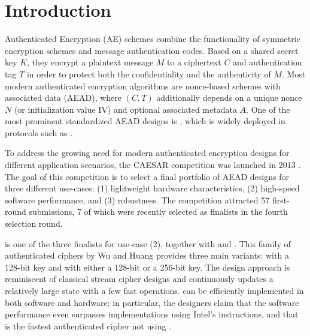 \section{Introduction}
\label{sec/Introduction}

Authenticated Encryption (AE) schemes combine the functionality of symmetric encryption schemes and message authentication codes.
Based on a shared secret key $K$, they encrypt a plaintext message $M$ to a ciphertext $C$ and authentication tag $T$ in order to protect both the confidentiality and the authenticity of $M$.
Most modern authenticated encryption algorithms are nonce-based schemes with associated data (AEAD),
where $(C, T)$ additionally depends on a unique nonce $N$ (or initialization value IV) and optional associated metadata $A$.
One of the most prominent standardized AEAD designs is  \cite{TODOMV05,TODONIST},
which is widely deployed in protocols such as .

To address the growing need for modern authenticated encryption designs for different application scenarios, 
the CAESAR competition was launched in 2013 \cite{CAESAR}.
The goal of this competition is to select a final portfolio of AEAD designs for three different use-cases:
(1) lightweight hardware characteristics,
(2) high-speed software performance, and
(3) robustness.
The competition attracted 57 first-round submissions, 7 of which were recently selected as finalists in the fourth selection round.

\morus is one of the three finalists for use-case (2), together with  and .
This family of authenticated ciphers by Wu and Huang \cite{MORUS} provides three main variants:
\morus[640] with a 128-bit key and \morus[1280] with either a 128-bit or a 256-bit key.
The design approach is reminiscent of classical stream cipher designs and
continuously updates a relatively large state with a few fast operations.
\morus can be efficiently implemented in both software and hardware;
in particular, the designers claim that the software performance even surpasses
 implementations using Intel's  instructions,
and that \morus is the fastest authenticated cipher not using  \cite{MORUS}.


